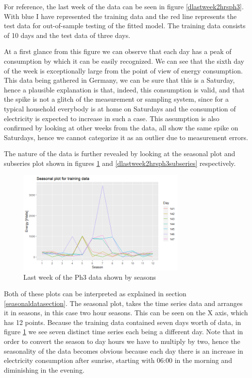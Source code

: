 \documentclass[12pt,a4paper,titlepage]{report}
\begin{document}
For reference, the last week of the data can be seen in figure \ref{dlastweek2hrsph3}.
With blue I have represented the training data and the red line represents the test data for out-of-sample testing of the fitted model. The training data consists of 10 days and the test data of three days.

At a first glance from this figure we can observe that each day has a peak of consumption by which it can be easily recognized. We can see that the sixth day of the week is exceptionally large from the point of view of energy consumption. This data being gathered in Germany, we can be sure that this is a Saturday, hence a plausible explanation is that, indeed, this consumption is valid, and that the spike is not a glitch of the measurement or sampling system, since for a typical household everybody is at home on Saturdays and the consumption of electricity is expected to increase in such a case. This assumption is also confirmed by looking at other weeks from the data, all show the same spike on Saturdays, hence we cannot categorize it as an outlier due to measurement errors.

The nature of the data is further revealed by looking at the seasonal plot and subseries plot shown in figures \ref{dlastweek2hrsph3seasonal} and \ref{dlastweek2hrsph3subseries} respectively.

\begin{figure}[h]
    \centering
    \includegraphics[width=0.75\textwidth]{dlastweek2hrsph3seasonal}
    \caption{Last week of the Ph3 data shown by seasons}
    \label{dlastweek2hrsph3seasonal}
\end{figure}

Both of these plots can be interpreted as explained in section \ref{seasonaldatasection}.
The seasonal plot, takes the time series data and arranges it in seasons, in this case two hour seasons. This can be seen on the X axis, which has 12 points. Because the training data contained seven days worth of data, in figure \ref{dlastweek2hrsph3seasonal} we see seven distinct time series each being a different day. Note that in order to convert the season to day hours we have to multiply by two, hence the seasonality of the data becomes obvious because each day there is an increase in electricity consumption after sunrise, starting with 06:00 in the morning and diminishing in the evening.
\end{document}
